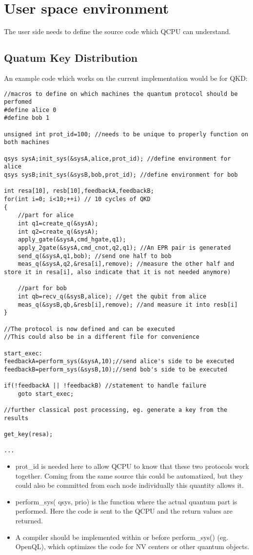 \documentclass[]{article}
\begin{document}
\section{User space environment}
The user side needs to define the source code which QCPU can understand. 
\subsection{Quatum Key Distribution}
An example code which works on the current implementation would be for QKD:
\begin{lstlisting}[style=CStyle]
//macros to define on which machines the quantum protocol should be perfomed
#define alice 0
#define bob 1  

unsigned int prot_id=100; //needs to be unique to properly function on both machines

qsys sysA;init_sys(&sysA,alice,prot_id); //define environment for alice
qsys sysB;init_sys(&sysB,bob,prot_id); //define environment for bob

int resa[10], resb[10],feedbackA,feedbackB;
for(int i=0; i<10;++i) // 10 cycles of QKD
{
	//part for alice
	int q1=create_q(&sysA);
	int q2=create_q(&sysA);
	apply_gate(&sysA,cmd_hgate,q1);
	apply_2gate(&sysA,cmd_cnot,q2,q1); //An EPR pair is generated
	send_q(&sysA,q1,bob); //send one half to bob
	meas_q(&sysA,q2,&resa[i],remove); //measure the other half and store it in resa[i], also indicate that it is not needed anymore)
	
	//part for bob
	int qb=recv_q(&sysB,alice); //get the qubit from alice
	meas_q(&sysB,qb,&resb[i],remove); //and measure it into resb[i]
}

//The protocol is now defined and can be executed
//This could also be in a different file for convenience 

start_exec:
feedbackA=perform_sys(&sysA,10);//send alice's side to be executed
feedbackB=perform_sys(&sysB,10);//send bob's side to be executed

if(!feedbackA || !feedbackB) //statement to handle failure
	goto start_exec;

//further classical post processing, eg. generate a key from the results

get_key(resa);

...

\end{lstlisting}
\begin{itemize}
	\item prot\_id is needed here to allow QCPU to know that these two protocols work together. Coming from the same source this could be automatized, but they could also be committed from each node individually this quantity allows it.
	\item perform\_sys( qsys, prio) is the function where the actual quantum part is performed. Here the code is sent to the QCPU and the return values are returned.
	\item A compiler should be implemented within or before perform\_sys() (eg. OpenQL), which optimizes the code for NV centers or other quantum objects.
\end{itemize}
\end{document}
